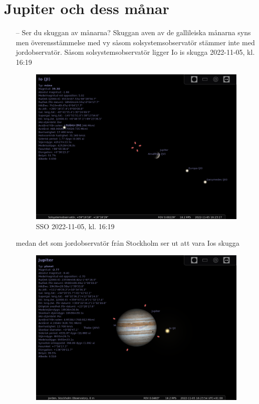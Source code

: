 \documentclass[./exercises.tex]{subfiles}
\begin{document}
\section{Jupiter och dess månar}
\begin{itemize}
\item[--] Ser du skuggan av månarna?
Skuggan aven av de gallileiska månarna syns men överensstämmelse med vy såsom solsystemsobservatör
stämmer inte med jordobservatör.
Såsom solsystemsobservatör ligger Io is skugga 2022-11-05, kl. 16:19 
 \begin{figure}[H]
\centering
  \includegraphics[scale=0.3]{stellarium-041.png}
  \caption{SSO 2022-11-05, kl. 16:19 }
  \label{fig4}
\end{figure}
medan det som jordobservatör från Stockholm ser ut att vara Ios skugga
\begin{figure}[H]
\centering
  \includegraphics[scale=0.3]{stellarium-042.png}

\end{figure}
\end{itemize}
\end{document}
